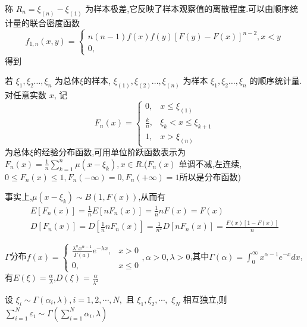 \documentclass[10pt]{yerbaformat}
\begin{document}
\begin{definition}[极差]
    称 $R_{n}=\xi_{(n)}-\xi_{(1)}$ 为样本极差,它反映了样本观察值的离散程度.可以由顺序统计量的联合密度函数$$f_{1, n}(x, y)=\left\{\begin{array}{c}n(n-1) f(x) f(y)[F(y)-F(x)]^{n-2}, x<y \\ 0,\end{array}\right.$$得到
\end{definition}

\begin{definition}[经验分布函数]
    若 $\xi_{1}, \xi_{2} \ldots, \xi_{n}$ 为总体$\xi$的样本, $\xi_{(1)}, \xi_{(2)} \ldots, \xi_{(n)}$ 为样本 $\xi_{1}, \xi_{2} \ldots, \xi_{n}$ 的顺序统计量.对任意实数 $x$, 记$$F_{n}(x)=\left\{\begin{array}{cc}0, & x \leq \xi_{(1)} \\ \frac{k}{n}, & \xi_{k}<x \leq \xi_{k+1} \\ 1, & x>\xi_{(n)}\end{array}\right.$$为总体$\xi$的经验分布函数,可用单位阶跃函数表示为$F_{n}(x)=\frac{1}{n} \sum_{k=1}^{n} \mu\left(x-\xi_{k}\right), x \in R$.($F_{n}(x)$ 单调不减,左连续, $0 \leq F_{n}(x) \leq 1, F_{n}(-\infty)=0, F_{n}(+\infty)=1$所以是分布函数)
\end{definition}

\par 事实上,$\mu\left(x-\xi_{k}\right) \sim B(1, F(x))$,从而有$$\begin{array}{c}
        E\left[F_{n}(x)\right]=\frac{1}{n} E\left[n F_{n}(x)\right]=\frac{1}{n} n F(x)=F(x) \\
        D\left[F_{n}(x)\right]=D\left[\frac{1}{n} n F_{n}(x)\right]=\frac{1}{n^{2}} D\left[n F_{n}(x)\right]=\frac{F(x)[1-F(x)]}{n}
    \end{array}$$

\par $ \Gamma $分布$f(x)=\left\{\begin{array}{cl}\frac{\lambda^{a} x^{\alpha-1}}{\Gamma(a)} e^{-\lambda x}, & x>0 \\ 0, & x \leqslant 0\end{array}, \alpha>0, \lambda>0\right.$,其中$\Gamma(\alpha)=\int_{0}^{\infty} x^{\alpha-1} e^{-x} d x$,有$E(\xi)=\frac{\alpha}{\lambda}$,$D(\xi)=\frac{\alpha}{{\lambda}^{2}}$
\begin{theorem}
    设 $\xi_{i} \sim \Gamma\left(\alpha_{i}, \lambda\right), i=1,2, \cdots, N,$ 且 $\xi_{1}, \xi_{2}, \cdots,$
    $\xi_{N}$ 相互独立,则 $\sum_{i=1}^{N} \varepsilon_{i} \sim \Gamma\left(\sum_{i=1}^{N} \alpha_{i}, \lambda\right)$
\end{theorem}
\end{document}
